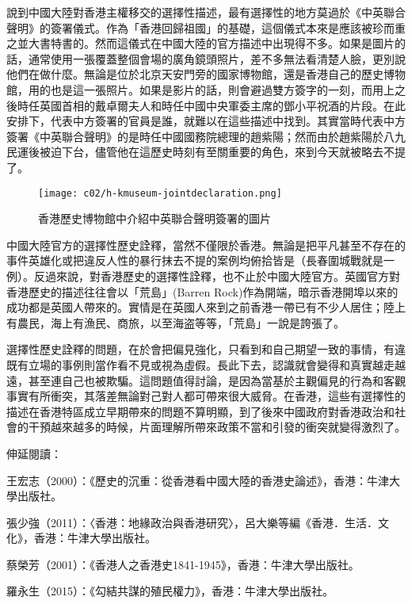 說到中國大陸對香港主權移交的選擇性描述，最有選擇性的地方莫過於《中英聯合聲明》的簽署儀式。作為「香港回歸祖國」的基礎，這個儀式本來是應該被珍而重之並大書特書的。然而這儀式在中國大陸的官方描述中出現得不多。如果是圖片的話，通常使用一張覆蓋整個會場的廣角鏡頭照片，差不多無法看清楚人臉，更別說他們在做什麼。無論是位於北京天安門旁的國家博物館，還是香港自己的歷史博物館，用的也是這一張照片。如果是影片的話，則會避過雙方簽字的一刻，而用上之後時任英國首相的戴卓爾夫人和時任中國中央軍委主席的鄧小平祝酒的片段。在此安排下，代表中方簽署的官員是誰，就難以在這些描述中找到。其實當時代表中方簽署《中英聯合聲明》的是時任中國國務院總理的趙紫陽；然而由於趙紫陽於八九民運後被迫下台，儘管他在這歷史時刻有至關重要的角色，來到今天就被略去不提了。

\begin{figure}[htbp]
    \centering
    \texttt{[image: c02/h-kmuseum-jointdeclaration.png]}

    \caption{香港歷史博物館中介紹中英聯合聲明簽署的圖片} 
\end{figure}

中國大陸官方的選擇性歷史詮釋，當然不僅限於香港。無論是把平凡甚至不存在的事件英雄化或把違反人性的暴行抹去不提的案例均俯拾皆是（長春圍城戰就是一例）。反過來說，對香港歷史的選擇性詮釋，也不止於中國大陸官方。英國官方對香港歷史的描述往往會以「荒島」(Barren Rock)作為開端，暗示香港開埠以來的成功都是英國人帶來的。實情是在英國人來到之前香港一帶已有不少人居住；陸上有農民，海上有漁民、商旅，以至海盗等等，「荒島」一說是誇張了。

選擇性歷史詮釋的問題，在於會把偏見強化，只看到和自己期望一致的事情，有違既有立場的事例則當作看不見或視為虛假。長此下去，認識就會變得和真實越走越遠，甚至連自己也被欺騙。這問題值得討論，是因為當基於主觀偏見的行為和客觀事實有所衝突，其落差無論對己對人都可帶來很大威脅。在香港，這些有選擇性的描述在香港特區成立早期帶來的問題不算明顯，到了後來中國政府對香港政治和社會的干預越來越多的時候，片面理解所帶來政策不當和引發的衝突就變得激烈了。


伸延閱讀：

王宏志（2000）：《歷史的沉重：從香港看中國大陸的香港史論述》，香港：牛津大學出版社。

張少強（2011）：〈香港：地緣政治與香港研究〉，呂大樂等編《香港．生活．文化》，香港：牛津大學出版社。

蔡榮芳（2001）：《香港人之香港史1841-1945》，香港：牛津大學出版社。

羅永生（2015）：《勾結共謀的殖民權力》，香港：牛津大學出版社。